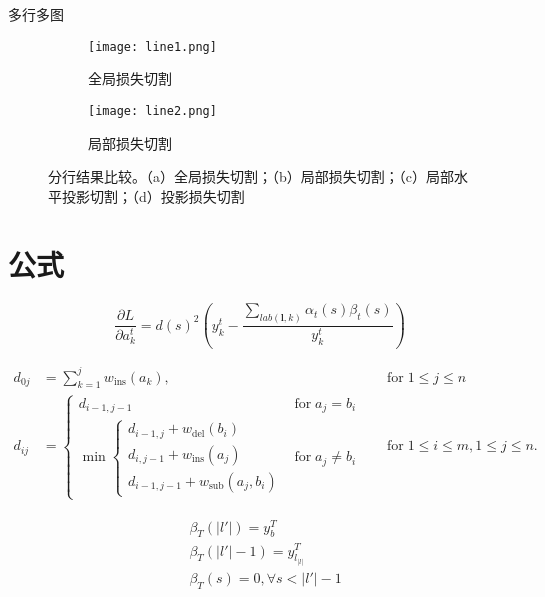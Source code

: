 \documentclass[winfonts]{njuthesis}
\begin{document}
多行多图
\begin{figure}[ht!]
    \centering
    \begin{subfigure}{\textwidth}
        \centering
        \texttt{[image: line1.png]}
        \caption{全局损失切割}
        \label{fig:line1}
    \end{subfigure}
    \begin{subfigure}{\textwidth}
    	\centering
        \texttt{[image: line2.png]}
        \caption{局部损失切割}
        \label{fig:line2}
    \end{subfigure}
    \caption{分行结果比较。（a）全局损失切割；（b）局部损失切割；（c）局部水平投影切割；（d）投影损失切割}
\end{figure}

\newpage %


\section{公式}

\begin{equation}
\frac{\partial L}{\partial a_{k}^t} = {d(s)}^2 (y_{k}^t - \frac{\sum_{lab(\mathbf{l},k)} \alpha_t(s)\beta_t(s) }{y_{k}^t} )
\end{equation}

\begin{equation}
\begin{aligned}
d_{{0j}}&=\sum _{{k=1}}^{{j}}w_{{\mathrm  {ins}}}(a_{{k}}),\quad &{\text{for}}\;1\leq j\leq n\\
d_{{ij}}&={\begin{cases}d_{{i-1,j-1}}&{\text{for}}\;a_{{j}}=b_{{i}}\\\min {\begin{cases}d_{{i-1,j}}+w_{{\mathrm  {del}}}(b_{{i}})\\d_{{i,j-1}}+w_{{\mathrm  {ins}}}(a_{{j}})\\d_{{i-1,j-1}}+w_{{\mathrm  {sub}}}(a_{{j}},b_{{i}})\end{cases}}&{\text{for}}\;a_{{j}}\neq b_{{i}}\end{cases}}\quad &{\text{for}}\;1\leq i\leq m,1\leq j\leq n.
\end{aligned}
\end{equation}

\begin{equation}
\begin{aligned}
&\beta_T(|l{}'|)=y_{b}^{T}\\
&\beta_T(|l{}'|-1)=y_{l_|l|}^{T} \\
&\beta_T(s)=0, \forall s < |l{}'|-1
\end{aligned}
\end{equation}
\end{document}
